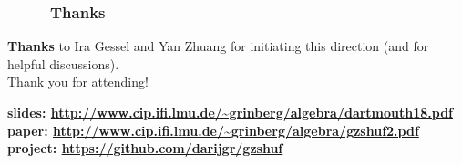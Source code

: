 \documentclass{beamer}
\newcommand{\red}{\color{red}}
\newcommand{\fti}[1]{\frametitle{\ \ \ \ \ #1}}
\theoremstyle{plain}
\begin{document}
      

      

      

      




\begin{frame}
\fti{Thanks}

\textbf{Thanks} to Ira Gessel and Yan Zhuang for initiating this direction
(and for helpful discussions). \\
Thank you for attending!

\vspace{3cm}

\textbf{slides: \red \url{http://www.cip.ifi.lmu.de/~grinberg/algebra/dartmouth18.pdf}} \\
\textbf{paper: \red \url{http://www.cip.ifi.lmu.de/~grinberg/algebra/gzshuf2.pdf}} \\
\textbf{project: \red \url{https://github.com/darijgr/gzshuf}}

\end{frame}
\end{document}
